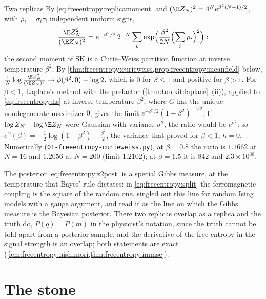 \begin{refsection}
\begin{computation}{Two replicas}\label{comp:freeentropy:secondmoment}
\step By \eqref{eq:freeentropy:replicamoment} and $(\E Z_N)^2=4^Ne^{\beta^2(N-1)/2}$, with $\rho_i=\sigma_i\tau_i$ independent uniform signs,
\[
\frac{\E Z_N^2}{(\E Z_N)^2}=e^{-\beta^2/2}\,2^{-N}\sum_\rho\exp\Bigl(\frac{\beta^2}{2N}\Bigl(\sum_i\rho_i\Bigr)^2\Bigr):
\]
the second moment of SK is a Curie--Weiss partition function at inverse temperature $\beta^2$.
\step By \cref{thm:freeentropy:curieweiss,prop:freeentropy:meanfield} below, $\frac1N\log\frac{\E Z_N^2}{(\E Z_N)^2}\to\phi(\beta^2,0)-\log2$, which is $0$ for $\beta\le1$ and positive for $\beta>1$. For $\beta<1$, Laplace's method with the prefactor (\cref{thm:toolkit:laplace}~(ii)), applied to \eqref{eq:freeentropy:hs} at inverse temperature $\beta^2$, where $G$ has the unique nondegenerate maximizer $0$, gives the limit $e^{-\beta^2/2}(1-\beta^2)^{-1/2}$.
\step If $\log Z_N-\log\E Z_N$ were Gaussian with variance $\sigma^2$, the ratio would be $e^{\sigma^2}$: so $\sigma^2(\beta)=-\frac12\log(1-\beta^2)-\frac{\beta^2}2$, the variance that \textcite{AizenmanLebowitzRuelle1987} proved for $\beta<1$, $h=0$. Numerically (\texttt{01-freeentropy-curieweiss.py}), at $\beta=0.8$ the ratio is $1.1662$ at $N=16$ and $1.2056$ at $N=200$ (limit $1.2102$); at $\beta=1.5$ it is $842$ and $2.3\times10^{38}$.
\end{computation}

The posterior \eqref{eq:freeentropy:z2post} is a special Gibbs measure, at the temperature that Bayes' rule dictates: in \eqref{eq:freeentropy:split} the ferromagnetic coupling is the square of the random one. \Textcite{Nishimori1981} singled out this line for random Ising models with a gauge argument, and \textcite{Iba1999} read it as the line on which the Gibbs measure is the Bayesian posterior. There two replicas overlap as a replica and the truth do, $P(q)=P(m)$ in the physicist's notation, since the truth cannot be told apart from a posterior sample, and the derivative of the free entropy in the signal strength is an overlap; both statements are exact (\cref{lem:freeentropy:nishimori,thm:freeentropy:immse}).

\section{The stone}\label{sec:freeentropy:stone}


\end{refsection}
